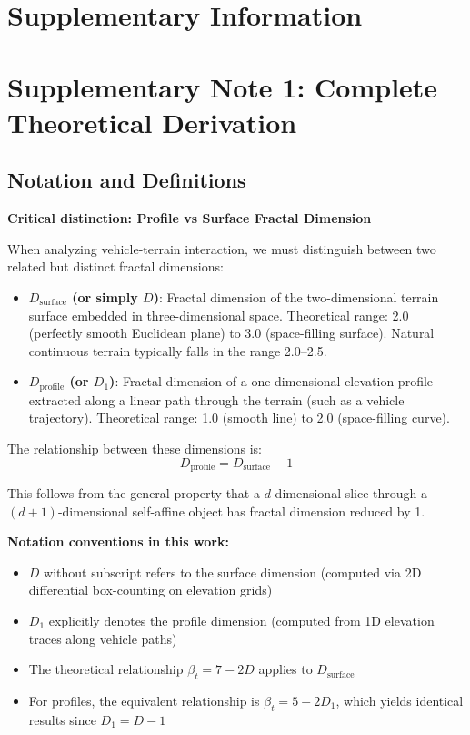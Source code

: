 \documentclass[11pt,letterpaper]{article}
\begin{document}

\clearpage
\appendix

\section{Supplementary Information}

\section{Supplementary Note 1: Complete Theoretical Derivation}

\subsection{Notation and Definitions}

\textbf{Critical distinction: Profile vs Surface Fractal Dimension}

When analyzing vehicle-terrain interaction, we must distinguish between two related but distinct fractal dimensions:

\begin{itemize}
\item \textbf{$D_{\text{surface}}$ (or simply $D$)}: Fractal dimension of the two-dimensional terrain surface embedded in three-dimensional space. Theoretical range: 2.0 (perfectly smooth Euclidean plane) to 3.0 (space-filling surface). Natural continuous terrain typically falls in the range 2.0--2.5.

\item \textbf{$D_{\text{profile}}$ (or $D_1$)}: Fractal dimension of a one-dimensional elevation profile extracted along a linear path through the terrain (such as a vehicle trajectory). Theoretical range: 1.0 (smooth line) to 2.0 (space-filling curve).
\end{itemize}

The relationship between these dimensions is:
\begin{equation}
D_{\text{profile}} = D_{\text{surface}} - 1
\end{equation}

This follows from the general property that a $d$-dimensional slice through a $(d+1)$-dimensional self-affine object has fractal dimension reduced by 1.

\textbf{Notation conventions in this work:}
\begin{itemize}
\item $D$ without subscript refers to the surface dimension (computed via 2D differential box-counting on elevation grids)
\item $D_1$ explicitly denotes the profile dimension (computed from 1D elevation traces along vehicle paths)
\item The theoretical relationship $\beta_t = 7-2D$ applies to $D_{\text{surface}}$
\item For profiles, the equivalent relationship is $\beta_t = 5-2D_1$, which yields identical results since $D_1 = D-1$
\end{itemize}
\end{document}
